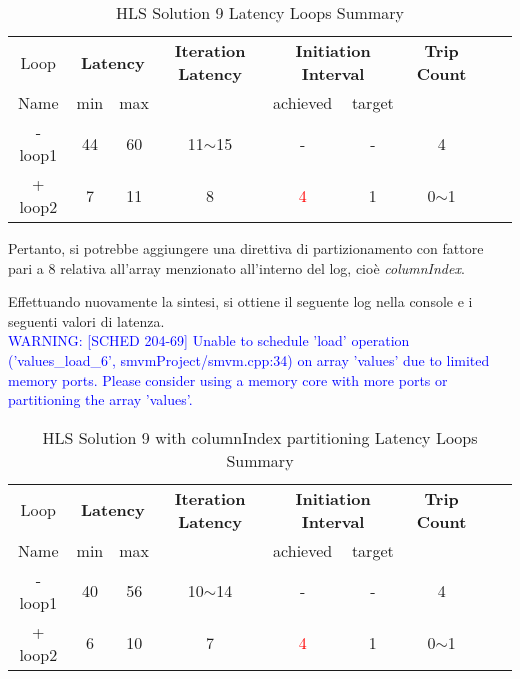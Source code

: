 \begin{table}[H]
	\centering
	\begin{tabular}{|c|c|c|c|c|c|c|c|c|}
		\hline
		\multicolumn{1}{|c|}{Loop} & \multicolumn{2}{|c|}{\textbf{Latency}} & \multicolumn{1}{c|}{\textbf{Iteration Latency}} & \multicolumn{2}{c|}{\textbf{Initiation Interval}} & \multicolumn{1}{c|}{\textbf{Trip Count}}  \\
		Name & min & max &  & achieved & target &  \\
		\hline
		- loop1 & 44 & 60 & 11$\sim$15 & - & - & 4 \\
		+ loop2 & 7 & 11 & 8 & \textcolor{red}{4} & 1 & 0$\sim$1 \\
		\hline
	\end{tabular}
	\caption{HLS Solution 9 Latency Loops Summary}
	\label{tab:hls-solution-9-loop-summary}
\end{table}

Pertanto, si potrebbe aggiungere una direttiva di partizionamento con fattore pari a 8 relativa all'array menzionato all'interno del log, cioè \textit{columnIndex}.



Effettuando nuovamente la sintesi, si ottiene il seguente log nella console e i seguenti valori di latenza.
\\
\textcolor{blue}{WARNING: [SCHED 204-69] Unable to schedule 'load' operation ('values\_load\_6', smvmProject/smvm.cpp:34) on array 'values' due to limited memory ports. Please consider using a memory core with more ports or partitioning the array 'values'.}

\begin{table}[H]
	\centering
	\begin{tabular}{|c|c|c|c|c|c|c|c|c|}
		\hline
		\multicolumn{1}{|c|}{Loop} & \multicolumn{2}{|c|}{\textbf{Latency}} & \multicolumn{1}{c|}{\textbf{Iteration Latency}} & \multicolumn{2}{c|}{\textbf{Initiation Interval}} & \multicolumn{1}{c|}{\textbf{Trip Count}}  \\
		Name & min & max &  & achieved & target &  \\
		\hline
		- loop1 & 40 & 56 & 10$\sim$14 & - & - & 4 \\
		+ loop2 & 6 & 10 & 7 & \textcolor{red}{4} & 1 & 0$\sim$1 \\
		\hline
	\end{tabular}
	\caption{HLS Solution 9 with columnIndex partitioning Latency Loops Summary}
	\label{tab:hls-solution-9-columnindex-partitioning-loop-summary}
\end{table}

